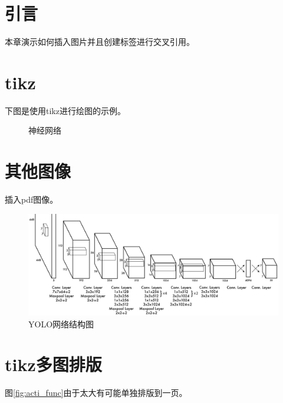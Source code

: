 \section{引言}

本章演示如何插入图片并且创建标签进行交叉引用。

\section{tikz}

下图是使用tikz进行绘图的示例。

\begin{figure}[h]
    \centering
    
    \caption{神经网络}
    \label{fig:basic_neural}
\end{figure}

\section{其他图像}

插入pdf图像。

\begin{figure}[htb]
    \centering
    \includegraphics[width=0.8\linewidth]{images/yolo.pdf}
    \caption{YOLO网络结构图\cite{yolo}}
    \label{fig:yolo_struct}
\end{figure}

\section{tikz多图排版}

图\ref{fig:acti_func}由于太大有可能单独排版到一页。

